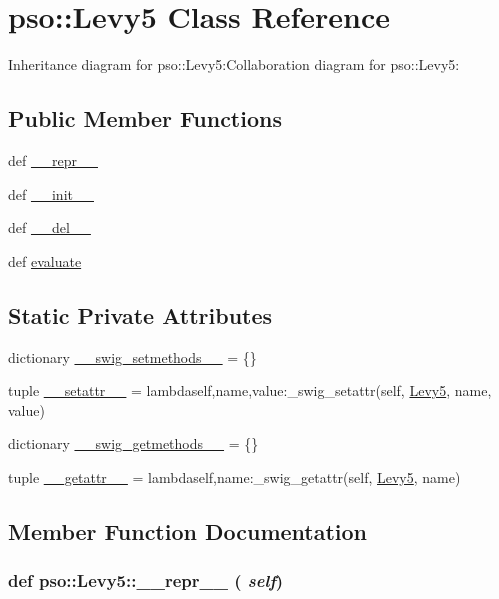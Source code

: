 \hypertarget{classpso_1_1Levy5}{
\section{pso::Levy5 Class Reference}
\label{classpso_1_1Levy5}
}
Inheritance diagram for pso::Levy5:Collaboration diagram for pso::Levy5:\subsection*{Public Member Functions}
\begin{CompactItemize}
\item 
def \hyperlink{classpso_1_1Levy5_b10ee4210aa6d53ec66a9c79e6558e20}{\_\-\_\-repr\_\-\_\-}
\item 
def \hyperlink{classpso_1_1Levy5_3499ee5a0ad4b26fb90f4aeb8b899585}{\_\-\_\-init\_\-\_\-}
\item 
def \hyperlink{classpso_1_1Levy5_b19922a937c1d22b02f24853a96bf271}{\_\-\_\-del\_\-\_\-}
\item 
def \hyperlink{classpso_1_1Levy5_7de80ec535099658cfc10dac658aaf4e}{evaluate}
\end{CompactItemize}
\subsection*{Static Private Attributes}
\begin{CompactItemize}
\item 
dictionary \hyperlink{classpso_1_1Levy5_93d6c8d420b6ad862c41073e1764d31e}{\_\-\_\-swig\_\-setmethods\_\-\_\-} = \{\}
\item 
tuple \hyperlink{classpso_1_1Levy5_4460b9b9e78befc1daa52a2cedfb6178}{\_\-\_\-setattr\_\-\_\-} = lambdaself,name,value:\_\-swig\_\-setattr(self, \hyperlink{classpso_1_1Levy5}{Levy5}, name, value)
\item 
dictionary \hyperlink{classpso_1_1Levy5_2bd3aa2316c11de1d2c76347089ec9fb}{\_\-\_\-swig\_\-getmethods\_\-\_\-} = \{\}
\item 
tuple \hyperlink{classpso_1_1Levy5_736e2ec83417ab688a210eb7045f606c}{\_\-\_\-getattr\_\-\_\-} = lambdaself,name:\_\-swig\_\-getattr(self, \hyperlink{classpso_1_1Levy5}{Levy5}, name)
\end{CompactItemize}


\subsection{Member Function Documentation}
\hypertarget{classpso_1_1Levy5_b10ee4210aa6d53ec66a9c79e6558e20}{
\subsubsection{\setlength{\rightskip}{0pt plus 5cm}def pso::Levy5::\_\-\_\-repr\_\-\_\- ( {\em self})}}
\label{classpso_1_1Levy5_b10ee4210aa6d53ec66a9c79e6558e20}





